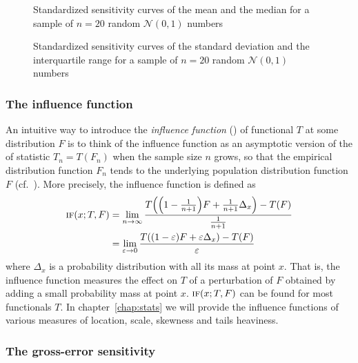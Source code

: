 \begin{figure}[h!]
    \centering
    \caption{Standardized sensitivity curves of the mean and the median for a sample of $n=20$ random $\mathcal{N}(0,1)$ numbers}
    \label{fig:theory:SClocation}
\end{figure}

\begin{figure}[h!]
    \centering
    \caption{Standardized sensitivity curves of the standard deviation and the interquartile range for a sample of $n=20$ random $\mathcal{N}(0,1)$ numbers}
    \label{fig:theory:SCscale}
\end{figure}


\subsubsection{The influence function}

An intuitive way to introduce the \emph{influence function} () of
functional $T$ at some distribution $F$ is to think of the influence function
as an asymptotic version of the  of statistic $T_n=T(F_n)$
when the sample size $n$ grows, so that the empirical distribution function
$F_n$ tends to the underlying population distribution function $F$ (cf.\
\citealp{hampel:1974}). More precisely, the influence function is defined as
%
\begin{align*}
    \stsc{IF}(x; T, F) 
        &= \lim_{n\rightarrow\infty} \frac{T\left(\left(1-\frac{1}{n+1}\right) F + 
            \frac{1}{n+1} \Delta_x\right) - T(F)}{\frac{1}{n+1}} \\
        &= \lim_{\varepsilon\rightarrow 0} \frac{T\left((1-\varepsilon) F + 
            \varepsilon\Delta_x\right) - T(F)}{\varepsilon}
\end{align*}
%
where $\Delta_x$ is a probability distribution with all its mass at point
$x$. That is, the influence function measures the effect on $T$ of a
perturbation of $F$ obtained by adding a small probability mass at point $x$.
$\stsc{IF}(x;T,F)$ can be found for most functionals $T$. In
chapter~\ref{chap:stats} we will provide the influence functions
of various measures of location, scale, skewness and tails heaviness.


\subsubsection{The gross-error sensitivity}

